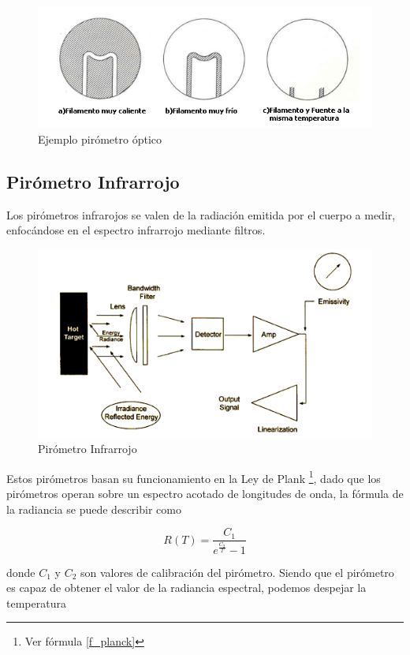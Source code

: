 \documentclass[10pt,a4paper]{article}
\begin{document}
			\begin{figure}[H]
				\centering\includegraphics[scale=0.75]{images/fila.png}\caption{Ejemplo pirómetro óptico}
			\end{figure}

		\subsection{Pirómetro Infrarrojo}
			Los pirómetros infrarojos se valen de la radiación emitida por el cuerpo a medir, enfocándose en el espectro infrarrojo mediante filtros.

			\begin{figure}[H]
				\centering\includegraphics[scale=0.3]{images/ir-pyro.png}\caption{Pirómetro Infrarrojo}
			\end{figure}

			Estos pirómetros basan su funcionamiento en la Ley de Plank \footnote{Ver fórmula \ref{f_planck}}, dado que los pirómetros operan sobre un espectro acotado de longitudes de onda, la fórmula de la radiancia se puede describir como

			\begin{equation}
				R(T) = \frac{C_1}{e^{\frac{C_2}{T}}-1}
			\end{equation}

			donde $C_1$ y $C_2$ son valores de calibración del pirómetro. Siendo que el pirómetro es capaz de obtener el valor de la radiancia espectral, podemos despejar la temperatura
\end{document}
